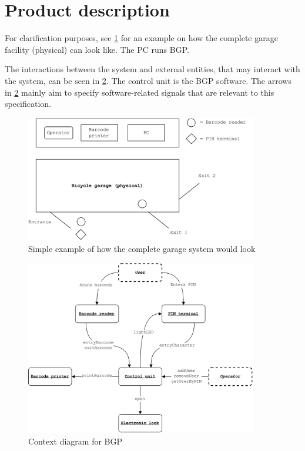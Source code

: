 \documentclass[12pt,titlepage,bibliography=totoc]{article}
\begin{document}
\section{Product description}
\label{sec:proddesc}

For clarification purposes, see \cref{fig:garage} for an example on how the complete garage facility (physical) can look like. The PC runs BGP.

The interactions between the system and external entities, that may interact with the system, can be seen in \cref{fig:context-hw}. The control unit is the BGP software. The arrows in \cref{fig:context-hw} mainly aim to specify software-related signals that are relevant to this specification.

\begin{figure}
	\centering
	\includegraphics[width=0.9\textwidth]{./assets/garage.png}
	\caption{Simple example of how the complete garage system would look}
	\label{fig:garage}
\end{figure}

\begin{figure}
	\centering
	\includegraphics[width=0.9\textwidth]{./assets/context.png}
	\caption{Context diagram for BGP}
	\label{fig:context-hw}
\end{figure}
\end{document}
